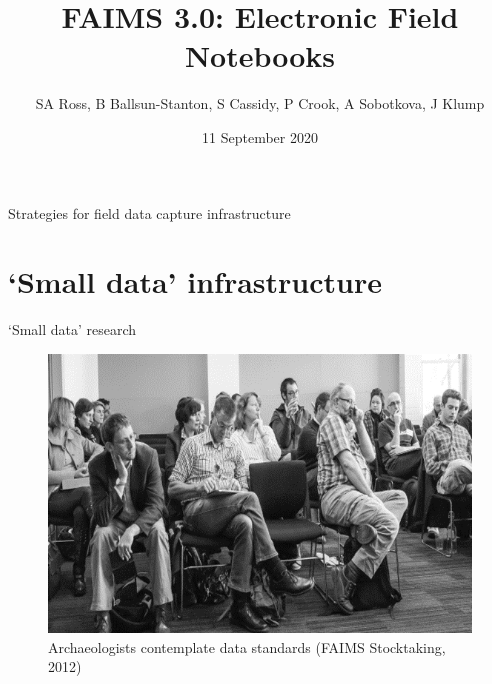 \documentclass[aspectratio=169, 12pt]{beamer} %
\title{FAIMS 3.0: Electronic Field Notebooks} %
\author{SA Ross, B Ballsun-Stanton, S Cassidy, P Crook, A Sobotkova, J Klump}   %
\institute{CAA Australasia Online Conference}   %
\date{11 September 2020}    %
\begin{document}

\maketitle

 


\begin{frame}{Strategies for field data capture infrastructure}
  \tableofcontents
\end{frame}

%



\section{`Small data' infrastructure}

\begin{frame}{`Small data' research}
 \begin{figure}[H]
    \centering
        \includegraphics[height=.75\textheight]{figures/Archaeologists-standards.png}
        \caption{Archaeologists contemplate data standards (FAIMS Stocktaking, 2012)}
        \label{fig:figure7}
 \end{figure}
\end{frame}
\end{document}

